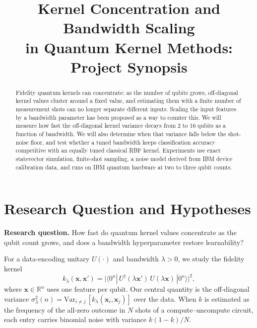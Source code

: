 \documentclass[conference]{IEEEtran}
\begin{document}
\title{Kernel Concentration and Bandwidth Scaling\\in Quantum Kernel Methods: Project Synopsis}

\author{
}

\maketitle

\begin{abstract}
Fidelity quantum kernels can concentrate: as the number of qubits grows, off-diagonal kernel values cluster around a fixed value, and estimating them with a finite number of measurement shots can no longer separate different inputs. Scaling the input features by a bandwidth parameter has been proposed as a way to counter this. We will measure how fast the off-diagonal kernel variance decays from 2 to 16 qubits as a function of bandwidth. We will also determine when that variance falls below the shot-noise floor, and test whether a tuned bandwidth keeps classification accuracy competitive with an equally tuned classical RBF kernel. Experiments use exact statevector simulation, finite-shot sampling, a noise model derived from IBM device calibration data, and runs on IBM quantum hardware at two to three qubit counts.
\end{abstract}

\section{Research Question and Hypotheses}
\textbf{Research question.} How fast do quantum kernel values concentrate as the qubit count grows, and does a bandwidth hyperparameter restore learnability?

For a data-encoding unitary $U(\cdot)$ and bandwidth $\lambda>0$, we study the fidelity kernel
\begin{equation}
k_\lambda(\mathbf{x},\mathbf{x}') = \bigl|\langle 0^{n}|\,U^{\dagger}(\lambda\mathbf{x}')\,U(\lambda\mathbf{x})\,|0^{n}\rangle\bigr|^{2},
\end{equation}
where $\mathbf{x}\in\mathbb{R}^{n}$ uses one feature per qubit. Our central quantity is the off-diagonal variance $\sigma^{2}_{\lambda}(n)=\mathrm{Var}_{i\neq j}\,[k_\lambda(\mathbf{x}_i,\mathbf{x}_j)]$ over the data. When $k$ is estimated as the frequency of the all-zero outcome in $N$ shots of a compute--uncompute circuit, each entry carries binomial noise with variance $k(1-k)/N$.
\end{document}
